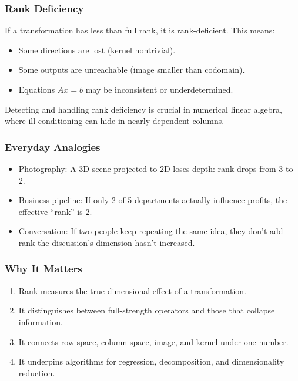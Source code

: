 \documentclass[
  letterpaper,
  DIV=11,
  numbers=noendperiod]{scrreprt}
\providecommand{\tightlist}{%
  \setlength{\itemsep}{0pt}\setlength{\parskip}{0pt}}
\begin{document}
\subsubsection{Rank Deficiency}\label{rank-deficiency}

If a transformation has less than full rank, it is rank-deficient. This
means:

\begin{itemize}
\tightlist
\item
  Some directions are lost (kernel nontrivial).
\item
  Some outputs are unreachable (image smaller than codomain).
\item
  Equations \(Ax=b\) may be inconsistent or underdetermined.
\end{itemize}

Detecting and handling rank deficiency is crucial in numerical linear
algebra, where ill-conditioning can hide in nearly dependent columns.

\subsubsection{Everyday Analogies}\label{everyday-analogies-45}

\begin{itemize}
\tightlist
\item
  Photography: A 3D scene projected to 2D loses depth: rank drops from 3
  to 2.
\item
  Business pipeline: If only 2 of 5 departments actually influence
  profits, the effective ``rank'' is 2.
\item
  Conversation: If two people keep repeating the same idea, they don't
  add rank-the discussion's dimension hasn't increased.
\end{itemize}

\subsubsection{Why It Matters}\label{why-it-matters-45}

\begin{enumerate}
\def\labelenumi{\arabic{enumi}.}
\tightlist
\item
  Rank measures the true dimensional effect of a transformation.
\item
  It distinguishes between full-strength operators and those that
  collapse information.
\item
  It connects row space, column space, image, and kernel under one
  number.
\item
  It underpins algorithms for regression, decomposition, and
  dimensionality reduction.
\end{enumerate}
\end{document}
